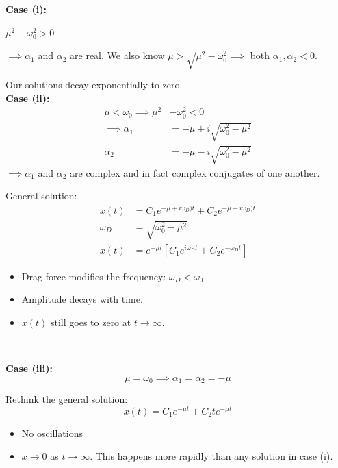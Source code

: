 \documentclass[twoside]{scrartcl}
\begin{document}
\textbf{Case (i):}

$\mu^2 - \omega_0^2 > 0$

$\implies \alpha_1$ and $\alpha_2$ are real. We also know $\mu > \sqrt{\mu^2 - \omega_0^2} \implies$ both $\alpha_1,\alpha_2 < 0$. 

Our solutions decay exponentially to zero.\\

\textbf{Case (ii):}
\[
\begin{aligned}
\mu < \omega_0
  \implies \mu^2 &- \omega_0^2 < 0\\
  \implies \alpha_1 &= -\mu + i\sqrt{\omega_0^2 -\mu^2}\\
  \alpha_2 &= -\mu -i\sqrt{\omega_0^2 - \mu^2}
\end{aligned}
\]
$\implies \alpha_1$ and $\alpha_2$ are complex and in fact complex conjugates of one another. 

General solution:
\[
\begin{aligned}
  x(t) &= C_1e^{-\mu + i\omega_D)t} + C_2e^{-\mu-i\omega_D)t}\\
  \omega_D &= \sqrt{\omega_0^2 - \mu^2}\\
  x(t) &= e^{-\mu t}[C_1e^{i\omega_Dt} + C_2e^{-\omega_Dt}]
\end{aligned}
\]

\begin{itemize}
  \item Drag force modifies the frequency: $\omega_D < \omega_0$
  \item Amplitude decays with time. 
  \item $x(t)$ still goes to zero at $t \to \infty$.
\end{itemize}~


\textbf{Case (iii):}
\[\mu = \omega_0 \implies \alpha_1 = \alpha_2 = -\mu\]

Rethink the general solution:
\[x(t) = C_1e^{-\mu t} + C_2te^{-\mu t}\]

\begin{itemize}
  \item No oscillations
  \item $x \to 0$ as $t \to \infty$. This happens more rapidly than any solution in case (i). 
\end{itemize}~
\end{document}
